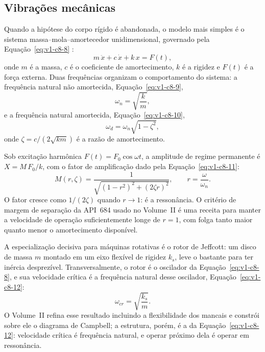 \documentclass[12pt,a4paper]{article}
\numberwithin{equation}{section}
\numberwithin{table}{section}
\numberwithin{figure}{section}
\begin{document}
\subsection{Vibrações mecânicas}\label{sub:v1-c8-vibracoes}

Quando a hipótese do corpo rígido é abandonada, o modelo mais simples é o
sistema massa--mola--amortecedor unidimensional, governado pela
Equação~\eqref{eq:v1-c8-8} \cite{rao2011}:
\begin{equation}\label{eq:v1-c8-8}
m\,\ddot{x} + c\,\dot{x} + k\,x = F(t),
\end{equation}
onde $m$ é a massa, $c$ é o coeficiente de amortecimento, $k$ é a rigidez e
$F(t)$ é a força externa. Duas frequências organizam o comportamento do
sistema: a frequência natural não amortecida, Equação~\eqref{eq:v1-c8-9},
\begin{equation}\label{eq:v1-c8-9}
\omega_n = \sqrt{\frac{k}{m}},
\end{equation}
e a frequência natural amortecida, Equação~\eqref{eq:v1-c8-10},
\begin{equation}\label{eq:v1-c8-10}
\omega_d = \omega_n\sqrt{1-\zeta^2},
\end{equation}
onde $\zeta = c/(2\sqrt{km})$ é a razão de amortecimento.

Sob excitação harmônica $F(t) = F_0\cos\omega t$, a amplitude de regime
permanente é $X = M\,F_0/k$, com o fator de amplificação dado pela
Equação~\eqref{eq:v1-c8-11}:
\begin{equation}\label{eq:v1-c8-11}
M(r,\zeta) = \frac{1}{\sqrt{(1-r^2)^2 + (2\zeta r)^2}}, \qquad
r = \frac{\omega}{\omega_n}.
\end{equation}
O fator cresce como $1/(2\zeta)$ quando $r \to 1$: é a ressonância. O
critério de margem de separação da API~684 usado no Volume~II é uma receita
para manter a velocidade de operação suficientemente longe de $r = 1$, com
folga tanto maior quanto menor o amortecimento disponível.

A especialização decisiva para máquinas rotativas é o rotor de Jeffcott: um
disco de massa $m$ montado em um eixo flexível de rigidez $k_s$, leve o
bastante para ter inércia desprezível. Transversalmente, o rotor é o
oscilador da Equação~\eqref{eq:v1-c8-8}, e sua velocidade crítica é a
frequência natural desse oscilador, Equação~\eqref{eq:v1-c8-12}:
\begin{equation}\label{eq:v1-c8-12}
\omega_{cr} = \sqrt{\frac{k_s}{m}}.
\end{equation}
O Volume~II refina esse resultado incluindo a flexibilidade dos mancais e
constrói sobre ele o diagrama de Campbell; a estrutura, porém, é a da
Equação~\eqref{eq:v1-c8-12}: velocidade crítica é frequência natural, e
operar próximo dela é operar em ressonância.
\end{document}
